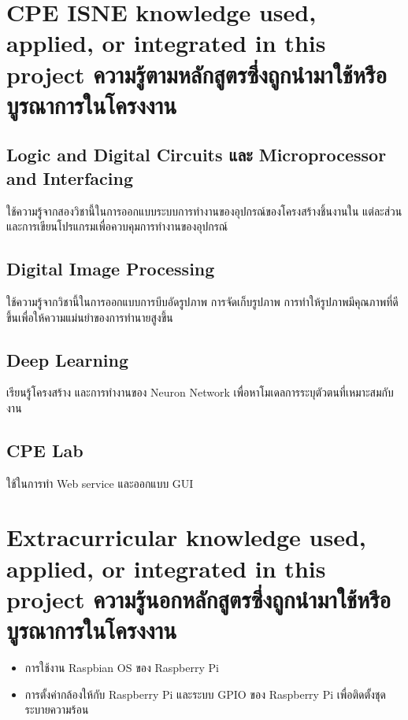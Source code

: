\section{\ifenglish%
\ifcpe CPE \else ISNE \fi knowledge used, applied, or integrated in this project
\else%
ความรู้ตามหลักสูตรซึ่งถูกนำมาใช้หรือบูรณาการในโครงงาน
\fi
}

\subsection{Logic and Digital Circuits และ Microprocessor and Interfacing}

ใช้ความรู้จากสองวิชานี้ในการออกแบบระบบการทำงานของอุปกรณ์ของโครงสร้างชิ้นงานใน
แต่ละส่วน และการเขียนโปรแกรมเพื่อควบคุมการทำงานของอุปกรณ์

\subsection{Digital Image Processing}

ใช้ความรู้จากวิชานี้ในการออกแบบการบีบอัดรูปภาพ การจัดเก็บรูปภาพ การทำให้รูปภาพมีคุณภาพที่ดีขึ้นเพื่อให้ความแม่นยำของการทำนายสูงขึ้น

\subsection{Deep Learning}
เรียนรู้โครงสร้าง และการทำงานของ Neuron Network เพื่อหาโมเดลการระบุตัวตนที่เหมาะสมกับงาน

\subsection{CPE Lab}
ใช้ในการทำ Web service และออกแบบ GUI

\section{\ifenglish%
Extracurricular knowledge used, applied, or integrated in this project
\else%
ความรู้นอกหลักสูตรซึ่งถูกนำมาใช้หรือบูรณาการในโครงงาน
\fi
}
\begin{itemize}
  \item การใช้งาน Raspbian OS ของ Raspberry Pi
  \item การตั้งค่ากล้องให้กับ Raspberry Pi และระบบ GPIO ของ Raspberry Pi เพื่อติดตั้งชุดระบายความร้อน
\end{itemize}



